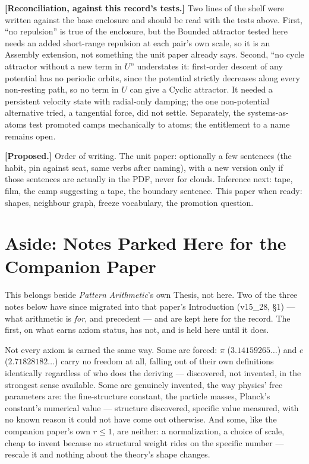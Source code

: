 \documentclass[12pt, a4paper]{article}
\begin{document}
\textbf{[Reconciliation, against this record's tests.]} Two lines of
the shelf were written against the base enclosure and should be read
with the tests above. First, ``no repulsion'' is true of the
enclosure, but the Bounded attractor tested here needs an added
short-range repulsion at each pair's own scale, so it is an Assembly
extension, not something the unit paper already says. Second, ``no
cycle attractor without a new term in $U$'' understates it:
first-order descent of any potential has no periodic orbits, since
the potential strictly decreases along every non-resting path, so no
term in $U$ can give a Cyclic attractor. It needed a persistent
velocity state with radial-only damping; the one non-potential
alternative tried, a tangential force, did not settle. Separately,
the systems-as-atoms test promoted camps mechanically to atoms; the
entitlement to a name remains open.

\textbf{[Proposed.]} Order of writing. The unit paper: optionally a
few sentences (the habit, pin against seat, same verbs after
naming), with a new version only if those sentences are actually in
the PDF, never for clouds. Inference next: tape, film, the camp
suggesting a tape, the boundary sentence. This paper when ready:
shapes, neighbour graph, freeze vocabulary, the promotion question.

\section*{Aside: Notes Parked Here for the Companion Paper}

This belongs beside \emph{Pattern Arithmetic}'s own Thesis, not here. Two of the three notes below have since
migrated into that paper's Introduction (v15\_28, \S1) --- what arithmetic is \emph{for}, and precedent --- and
are kept here for the record. The first, on what earns axiom status, has not, and is held here until it does.

Not every axiom is earned the same way. Some are forced: $\pi$
($3.14159265\ldots$) and $e$ ($2.71828182\ldots$) carry no freedom at
all, falling out of their own definitions identically regardless of
who does the deriving --- discovered, not invented, in the strongest
sense available. Some are genuinely invented, the way physics' free
parameters are: the fine-structure constant, the particle masses,
Planck's constant's numerical value --- structure discovered,
specific value measured, with no known reason it could not have come
out otherwise. And some, like the companion paper's own $r\le1$, are
neither: a normalization, a choice of scale, cheap to invent because
no structural weight rides on the specific number --- rescale it and
nothing about the theory's shape changes.
\end{document}
